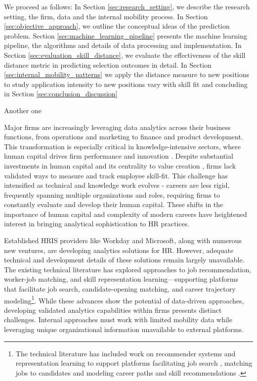\documentclass{article}
\begin{document}
We proceed as follows: In Section \ref{sec:research_setting}, we describe the research setting, the firm, data and the internal mobility process. In Section \ref{sec:objective_approach}, we outline the conceptual ideas of the prediction problem. Section \ref{sec:machine_learning_pipeline} presents the machine learning pipeline, the algorithms and details of data processing and implementation. In Section \ref{sec:evaluation_skill_distance}, we evaluate the effectiveness of the skill distance metric in predicting selection outcomes in detail. In Section \ref{sec:internal_mobility_patterns} we apply the distance measure to new positions to study application intensity to new positions vary with skill fit and concluding in Section \ref{sec:conclusion_discussion}





Another one 



Major firms are increasingly leveraging data analytics across their business functions, from operations and marketing to finance and product development. This transformation is especially critical in knowledge-intensive sectors, where human capital drives firm performance and innovation \parencite{riley2017human}. Despite substantial investments in human capital and its centrality to value creation \parencite{MGI2023Performance}, firms lack validated ways to measure and track employee skill-fit. This challenge has intensified as technical and knowledge work evolves - careers are less rigid, frequently spanning multiple organizations and roles, requiring firms to constantly evaluate and develop their human capital. These shifts in the importance of human capital and complexity of modern careers have heightened interest in bringing analytical sophistication to HR practices.

Established HRIS providers like Workday and Microsoft, along with numerous new ventures, are developing analytics solutions for HR. However, adequate technical and development details of these solutions remain largely unavailable. The existing technical literature has explored approaches to job recommendation, worker-job matching, and skill representation learning---supporting platforms that facilitate job search, candidate-opening matching, and career trajectory modeling\footnote{The technical literature has included work on recommender systems \cite{shaha2012survey,siting2012job} and representation learning \parencite{heap2014combining, zhu2018person, liu2019tripartite, bian2020learning} to support platforms facilitating job search \parencite{heap2014combining,giabelli2021skills2job}, matching jobs to candidates \parencite{zhu2018person,qin2020enhanced} and modeling career paths and skill recommendations \parencite{maurya2017bayesian, kokkodis2021demand}.}. While these advances show the potential of data-driven approaches, developing validated analytics capabilities within firms presents distinct challenges. Internal approaches must work with limited mobility data while leveraging unique organizational information unavailable to external platforms.
\end{document}
